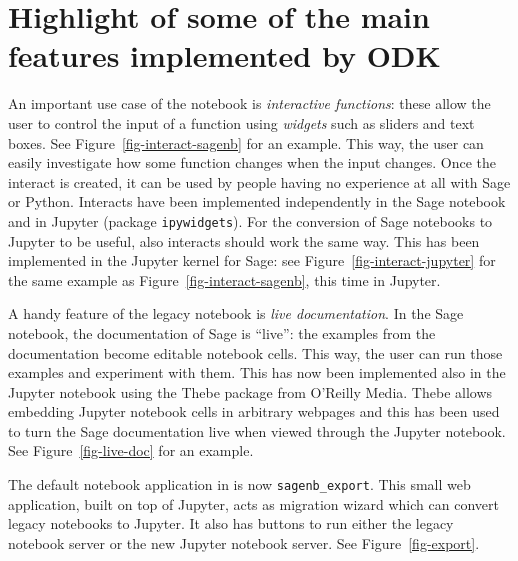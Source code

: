 \documentclass{deliverablereport}
\author{Florent Cayr\'e, Jeroen Demeyer, Nicolas M. Thi\'ery}
\begin{document}
\maketitle
\githubissuedescription
\tableofcontents

\section{Highlight of some of the main features implemented by ODK}

An important use case of the notebook is \emph{interactive functions}:
these allow the user to control the input of a function
using \emph{widgets} such as sliders and text boxes.
See Figure~\ref{fig-interact-sagenb} for an example.
This way, the user can easily investigate how some function changes
when the input changes.
Once the interact is created, it can be used by people having no experience
at all with Sage or Python.
Interacts have been implemented independently in the Sage notebook
and in Jupyter (package \texttt{ipywidgets}).
For the conversion of Sage notebooks to Jupyter to be useful,
also interacts should work the same way.
This has been implemented in the Jupyter kernel for Sage:
see Figure~\ref{fig-interact-jupyter} for the same example as
Figure~\ref{fig-interact-sagenb}, this time in Jupyter.

A handy feature of the legacy \Sage notebook is \emph{live documentation}.
In the Sage notebook, the documentation of Sage is ``live'':
the examples from the documentation become editable notebook cells.
This way, the user can run those examples and experiment with them.
This has now been implemented also in the Jupyter notebook using
the Thebe package from O'Reilly Media.
Thebe allows embedding Jupyter notebook cells in arbitrary webpages
and this has been used to turn the Sage documentation live when viewed
through the Jupyter notebook.
See Figure~\ref{fig-live-doc} for an example.

The default notebook application in \Sage is now
\texttt{sagenb\_export}.  This small web application, built on top of
Jupyter, acts as migration wizard which can convert legacy \Sage
notebooks to Jupyter. It also has buttons to run either the legacy
\Sage notebook server or the new Jupyter notebook server. See
Figure~\ref{fig-export}.
\end{document}
